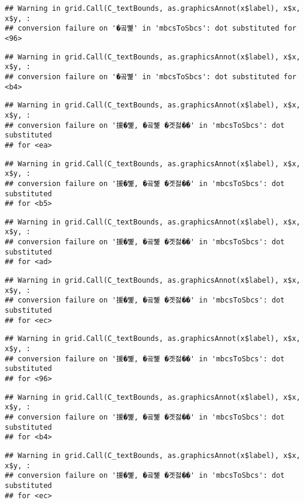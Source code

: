 \documentclass[
]{article}
\begin{document}
\begin{verbatim}
## Warning in grid.Call(C_textBounds, as.graphicsAnnot(x$label), x$x, x$y, :
## conversion failure on '�곸뼱' in 'mbcsToSbcs': dot substituted for <96>
\end{verbatim}

\begin{verbatim}
## Warning in grid.Call(C_textBounds, as.graphicsAnnot(x$label), x$x, x$y, :
## conversion failure on '�곸뼱' in 'mbcsToSbcs': dot substituted for <b4>
\end{verbatim}

\begin{verbatim}
## Warning in grid.Call(C_textBounds, as.graphicsAnnot(x$label), x$x, x$y, :
## conversion failure on '援�뼱, �곸뼱 �곗젏��' in 'mbcsToSbcs': dot substituted
## for <ea>
\end{verbatim}

\begin{verbatim}
## Warning in grid.Call(C_textBounds, as.graphicsAnnot(x$label), x$x, x$y, :
## conversion failure on '援�뼱, �곸뼱 �곗젏��' in 'mbcsToSbcs': dot substituted
## for <b5>
\end{verbatim}

\begin{verbatim}
## Warning in grid.Call(C_textBounds, as.graphicsAnnot(x$label), x$x, x$y, :
## conversion failure on '援�뼱, �곸뼱 �곗젏��' in 'mbcsToSbcs': dot substituted
## for <ad>
\end{verbatim}

\begin{verbatim}
## Warning in grid.Call(C_textBounds, as.graphicsAnnot(x$label), x$x, x$y, :
## conversion failure on '援�뼱, �곸뼱 �곗젏��' in 'mbcsToSbcs': dot substituted
## for <ec>
\end{verbatim}

\begin{verbatim}
## Warning in grid.Call(C_textBounds, as.graphicsAnnot(x$label), x$x, x$y, :
## conversion failure on '援�뼱, �곸뼱 �곗젏��' in 'mbcsToSbcs': dot substituted
## for <96>
\end{verbatim}

\begin{verbatim}
## Warning in grid.Call(C_textBounds, as.graphicsAnnot(x$label), x$x, x$y, :
## conversion failure on '援�뼱, �곸뼱 �곗젏��' in 'mbcsToSbcs': dot substituted
## for <b4>
\end{verbatim}

\begin{verbatim}
## Warning in grid.Call(C_textBounds, as.graphicsAnnot(x$label), x$x, x$y, :
## conversion failure on '援�뼱, �곸뼱 �곗젏��' in 'mbcsToSbcs': dot substituted
## for <ec>
\end{verbatim}
\end{document}
